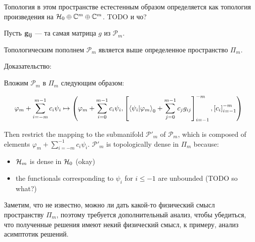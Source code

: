Топология в этом пространстве естестенным образом определяется как топология произведения на $\mathcal{H}_{0} \oplus \mathbb{C}^m \oplus \mathbb{C}^m$. TODO и чо?

Пусть $\vb{g_{ij}}$ — та самая матрица $g$ из $\mathcal{P}_m$. 

\begin{theorem}
Топологическим пополнем $\mathcal{P}_m$ является выше определенное пространство $\Pi_m$.
\end{theorem}

Доказательство:

Вложим $\mathcal{P}_m$ в $\Pi_m$ следующим образом:

\[
\varphi_m + \sum\limits_{i = -m}^{m - 1} c_i \psi_i \mapsto
\left(
\varphi_m + \sum\limits_{i = 0}^{m - 1} c_i \psi_i,
\left[ \ip{\psi_i}{\varphi_m}_0 + \sum\limits_{j = 0}^{m - 1} c_j g_{ij} \right]_{i = -1}^{-m},
\left[ c_i \right]_{i = -1}^{-m}
\right)
\]

Then restrict the mapping to the submanifold $\mathcal{P}'_m$ of $\mathcal{P}_m$, which is composed of elements $\varphi_m + \sum\limits_{i = - m}^{-1} c_i \psi_i$. $\mathcal{P}'_m$ is topologically dense in $\Pi_m$ because:

\begin{itemize}
\item $\mathcal{H}_{m}$ is dense in $\mathcal{H}_{0}$ (okay)
\item the functionals corresponding to $\psi_i$ for $i \le -1$ are unbounded (TODO so what?)
\end{itemize}

Заметим, что не известно, можно ли дать какой-то физический смысл пространству $\Pi_m$, поэтому требуется дополнительный анализ, чтобы убедиться, что полученные решения имеют некий физический смысл, к примеру, анализ асимптотик решений.